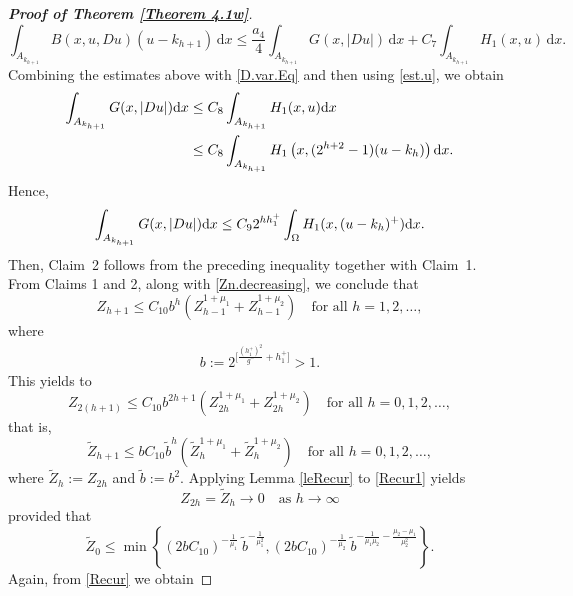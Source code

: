 \documentclass[10pt,reqno]{amsart}
\newcommand *\w{^\wedge}
\theoremstyle{definition}
\numberwithin{equation}{section}
\begin{document}
\begin{proof}[\textbf{Proof of Theorem \ref{Theorem 4.1w}}]
\[
\int_{A_{k_{h+1}}} B(x,u,D u)(u - k_{h+1}) \, \mathrm{d}x 
\leq \frac{a_4}{4} \int_{A_{k_{h+1}}} G(x,|D u|) \, \mathrm{d}x 
+ C_7 \int_{A_{k_{h+1}}} H_1(x,u) \, \mathrm{d}x.
\]
Combining the estimates above with \eqref{D.var.Eq} and then using \eqref{est.u}, we obtain
	\begin{align*}
		\int_{A_{k_{h+1}}}G(x,|D u|){\rm d}x &
		\leq  C_8\int_{A_{k_{h+1}}}H_1(x,u) {\rm d}x\\
		& \leq C_8\int_{A_{k_{h+1}}}H_1\left(x,(2^{h+2}-1)(u-k_h)\right) {\rm d}x.
	\end{align*}
	Hence,
	\begin{equation*}
		\int_{A_{k_{h+1}}}G(x,|D u|) {\rm d}x
		\leq C_92^{hh^+_1}\int_{\Omega}H_1(x,(u-k_h)^+) {\rm d}x.
	\end{equation*}
Then, Claim~2 follows from the preceding inequality together with Claim~1.\\
From Claims 1 and 2, along with \eqref{Zn.decreasing}, we conclude that
	\begin{equation}\label{Recur}
		Z_{h+1}\leq C_{10} b^h\left(Z_{h-1}^{1+\mu_1}+Z_{h-1}^{1+\mu_2}\right)\quad \text{for all }h=1,2,\ldots,
	\end{equation}
	where
	\begin{align*}
		b:=2^{\big[\frac{\left(h^+_1\right)^2}{g^-}+h^+_1\big]}>1.
	\end{align*}
	This yields to
	\begin{equation*}
		Z_{2(h+1)}\leq C_{10} b^{2h+1}\left(Z_{2h}^{1+\mu_1}+Z_{2h}^{1+\mu_2}\right)\quad \text{for all }h=0,1,2,\ldots,
	\end{equation*}
	that is,
	\begin{equation}\label{Recur1}
		\tilde{Z}_{h+1}\leq bC_{10} \tilde{b}^h\left(\tilde{Z}_h^{1+\mu_1}+\tilde{Z}_h^{1+\mu_2}\right) \quad \text{for all }h=0,1,2,\ldots,
	\end{equation}
	where $\tilde{Z}_h:=Z_{2h}$ and $\tilde{b}:=b^2$. Applying Lemma \ref{leRecur} to \eqref{Recur1} yields
	\begin{equation}\label{Recur+1}
		Z_{2h}=\tilde{Z}_h \to 0 \quad \text {as }  h\to \infty
	\end{equation}
	provided that
	\begin{equation}\label{Z_0}
		\tilde{Z}_{0}\leq \min\left\{(2bC_{10})^{-\frac{1}{\mu_1}}\ \tilde{b}^{-\frac{1}{\mu_1^{2}}},\left(2bC_{10}\right)^{-\frac{1}{\mu_2}}\ \tilde{b}^{-\frac{1}{\mu_1\mu_2}-\frac{\mu_2-\mu_1}{\mu_2^{2}}}\right\}.
	\end{equation}
	Again, from \eqref{Recur} we obtain

\end{proof}
\end{document}
